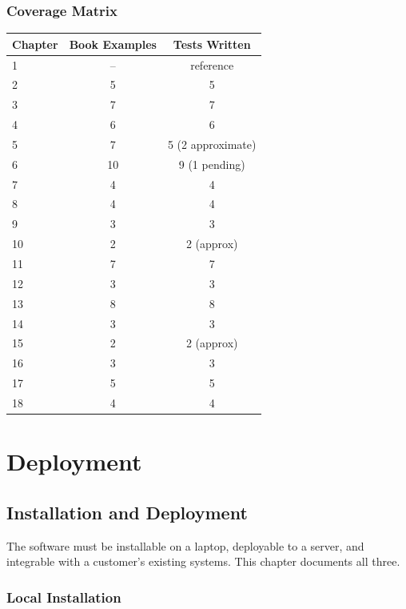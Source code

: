 \documentclass[11pt,a4paper,openany]{book}
\begin{document}
\section{Coverage Matrix}

\begin{longtable}{@{}lcc@{}}
\toprule
Chapter & Book Examples & Tests Written \\
\midrule
1 & -- & reference \\
2 & 5 & 5 \\
3 & 7 & 7 \\
4 & 6 & 6 \\
5 & 7 & 5 (2 approximate) \\
6 & 10 & 9 (1 pending) \\
7 & 4 & 4 \\
8 & 4 & 4 \\
9 & 3 & 3 \\
10 & 2 & 2 (approx) \\
11 & 7 & 7 \\
12 & 3 & 3 \\
13 & 8 & 8 \\
14 & 3 & 3 \\
15 & 2 & 2 (approx) \\
16 & 3 & 3 \\
17 & 5 & 5 \\
18 & 4 & 4 \\
\bottomrule
\end{longtable}

\part{Deployment}

\chapter{Installation and Deployment}

\begin{purpose}
The software must be installable on a laptop, deployable to a
server, and integrable with a customer's existing systems. This
chapter documents all three.
\end{purpose}

\section{Local Installation}
\end{document}

